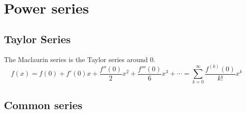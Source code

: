 \documentclass[fleqn,a4paper,11pt]{article}
\begin{document}
    \section{Power series} %

    \subsection{Taylor Series}

    The Maclaurin series is the Taylor series around \(0\).
    \begin{equation}
    f(x) = f(0) + f'(0) x + \frac{f''(0)} 2 x^2 + \frac{f'''(0)}{6}x^3 +\cdots
      = \sum_{k=0}^\infty \frac{f^{(k)}(0)}{k!}x^k
    \end{equation}

    \subsection{Common series}
\end{document}
